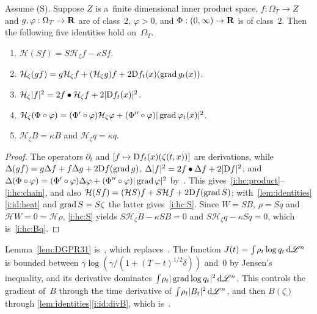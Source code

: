 \documentclass[a4paper,twoside,leqno]{article}
\newcommand{\heatop}{\mathcal{H}}          %
\begin{document}
\begin{lemma}
    \label{lem:heat_calculus}
    Assume (S). Suppose $Z$ is a~finite dimensional inner product space, $f : \Omega_T \to Z$ and
    $g, \varphi : \Omega_T \to \mathbf{R}$ are of class~$2$, $\varphi > 0$, and $\Phi : (0,\infty) \to \mathbf{R}$
    is of class~$2$. Then the following five identities hold on~$\Omega_T$.
    \begin{enumerate}
        \item \label{i:hc:S} $\heatop(S f) = S \heatop_\zeta f - \kappa S f$.
        \item \label{i:hc:product} $\heatop_\zeta(g f) = g \heatop_\zeta f + (\heatop_\zeta g) f + 2
        \uD f_t(x)(\grad g_t(x))$.
        \item \label{i:hc:square} $\heatop_\zeta |f|^2 = 2 f \bullet \heatop_\zeta f + 2 |\uD f_t
        (x)|^2$.
        \item \label{i:hc:chain} $\heatop_\zeta(\Phi \circ \varphi) = (\Phi' \circ \varphi)
        \heatop_\zeta \varphi + (\Phi'' \circ \varphi) |\grad \varphi_t(x)|^2$.
        \item \label{i:hc:Bq} $\heatop_\zeta B = \kappa B$ and $\heatop_\zeta q = \kappa q$.
    \end{enumerate}
\end{lemma}

\begin{proof}
    The operators $\partial_t$ and $[f \mapsto \mathrm{D} f_t(x)(\zeta(t,x))]$ are derivations, while
    $\Delta(g f) = g \Delta f + f \Delta g + 2 \mathrm{D} f(\operatorname{grad} g)$, $\Delta |f|^2 = 2 f \bullet \Delta f
    + 2 |\mathrm{D} f|^2$, and $\Delta (\Phi \circ \varphi) = (\Phi' \circ \varphi) \Delta \varphi +
    (\Phi'' \circ \varphi) |\operatorname{grad} \varphi|^2$ by~\cite[3.1.11]{Federer1969}. This
    gives~\ref{i:hc:product}--\ref{i:hc:chain}, and also $\heatop(S f) = (\heatop S) f + S \heatop
    f + 2 \uD f(\grad S)$; with~\ref{lem:identities}\ref{i:id:heat} and $\operatorname{grad} S = S \zeta$ the
    latter gives~\ref{i:hc:S}. Since $W = S B$, $\rho = S q$ and $\heatop W = 0 = \heatop
    \rho$, \ref{i:hc:S} yields $S \heatop_\zeta B - \kappa S B = 0$ and $S \heatop_\zeta q - \kappa
    S q = 0$, which is~\ref{i:hc:Bq}.
\end{proof}

\begin{miniremark}
    \label{mr:strategy31}
    Lemma~\ref{lem:DGPR31} is~\cite[Lemma~3.1]{DePhilippisGennaioliPigatiRindler2026}, which
    replaces~\cite[Lemma~3.2]{Gennaioli2026}. The function $J(t) = {\textstyle\int_{}^{}} \rho_t \log q_t
    \,\mathrm{d} \mathscr{L}^{n}$ is bounded between $\gamma \log(\gamma / (1 + (T-t)^{1/2} \delta))$ and~$0$ by
    Jensen's inequality, and its derivative dominates ${\textstyle\int_{}^{}} \rho_t |\operatorname{grad} \log q_t|^2 \,\mathrm{d}
    \mathscr{L}^{n}$. This controls the gradient of~$B$ through the time derivative of ${\textstyle\int_{}^{}}
    \rho_t |B_t|^2 \,\mathrm{d} \mathscr{L}^{n}$, and then $B(\zeta)$ through
    \ref{lem:identities}\ref{i:id:divB}, which is~\cite[(3.9)]{Gennaioli2026}.
\end{miniremark}
\end{document}
